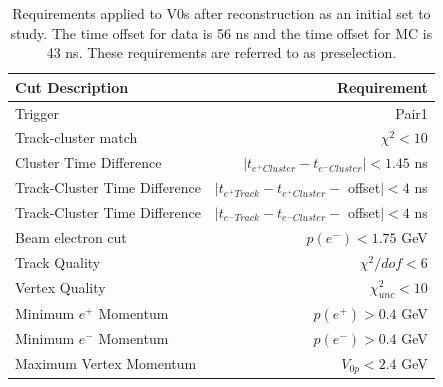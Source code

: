 

\begin{table}[t] 
    \centering
    \begin{tabular}{lr}
        \toprule
        \textbf{Cut Description} & \textbf{Requirement} \\
        \midrule
        Trigger & Pair1 \\
        Track-cluster match & $\chi^2 < 10$  \\
        Cluster Time Difference & $|t_{e^+ Cluster}-t_{e^- Cluster}|<1.45$ ns \\
        Track-Cluster Time Difference & $|t_{e^+ Track}-t_{e^+ Cluster} -$ offset$| < 4$ ns \\
        Track-Cluster Time Difference & $|t_{e^- Track}-t_{e^- Cluster} -$ offset$| < 4$ ns \\
        Beam electron cut & $p(e^{-}) < 1.75$ GeV \\
        Track Quality & $\chi^2/dof < 6$ \\
        Vertex Quality & $\chi^2_{unc} < 10$ \\ 
        Minimum $e^+$ Momentum & $p(e^+)>0.4$ GeV \\
        Minimum $e^-$ Momentum & $p(e^-)>0.4$ GeV \\
        Maximum Vertex Momentum & $V_{0p} < 2.4$ GeV \\
        \bottomrule
    \end{tabular}
    \caption{Requirements applied to V0s after reconstruction as an initial set to study. The time offset for data is 56 ns and the time offset for MC is 43 ns. These requirements are referred to as preselection.}
    \label{tab:preselection}
\end{table}

